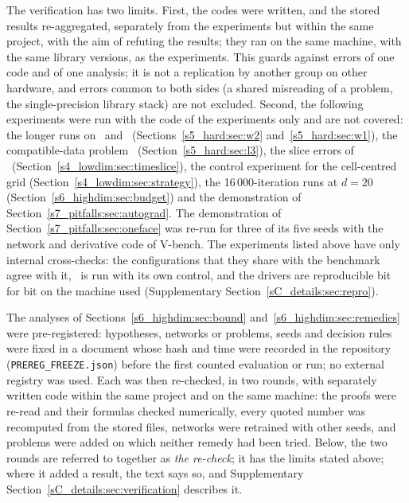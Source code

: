 The verification has two limits. First, the codes were written, and the stored results
re-aggregated, separately from the experiments but within the same project, with the aim of
refuting the results; they ran on the same machine, with the same library versions, as the
experiments. This guards against errors of one code and of one analysis; it is not a
replication by another group on other hardware, and errors common to both sides (a shared
misreading of a problem, the single-precision library stack) are not excluded. Second, the
following experiments were run with the code of the experiments only and are not covered:
the longer runs on \PWtwo\ and \PWone\ (Sections~\ref{s5_hard:sec:w2}
and~\ref{s5_hard:sec:w1}), the compatible-data problem \PLthreeS\
(Section~\ref{s5_hard:sec:l3}), the slice errors of \PH\ (Section~\ref{s4_lowdim:sec:timeslice}),
the control experiment for the cell-centred grid (Section~\ref{s4_lowdim:sec:strategy}), the
16\,000-iteration runs at $d=20$ (Section~\ref{s6_highdim:sec:budget}) and the demonstration
of Section~\ref{s7_pitfalls:sec:autograd}. The demonstration of Section~\ref{s7_pitfalls:sec:oneface}
was re-run for three of its five seeds with the network and derivative code of \textsf{V-bench}.
The experiments listed above have only internal cross-checks: the configurations that they share with the benchmark
agree with it, \PLthreeS\ is run with its own control, and the drivers are reproducible bit
for bit on the machine used (Supplementary Section~\ref{sC_details:sec:repro}).

The analyses of Sections~\ref{s6_highdim:sec:bound} and~\ref{s6_highdim:sec:remedies} were
pre-registered: hypotheses, networks or problems, seeds and decision rules were fixed in a
document whose hash and time were recorded in the repository (\texttt{PREREG\_FREEZE.json}) before
the first counted evaluation or run; no external registry was used. Each was
then re-checked, in two rounds, with separately written code within the same project and on the
same machine: the proofs were re-read and their formulas checked numerically, every quoted number
was recomputed from the stored files, networks were retrained with other seeds, and problems were
added on which neither remedy had been tried. Below, the two rounds are referred to together as
\emph{the re-check}; it has the limits stated above; where it added a result, the text says so, and
Supplementary Section~\ref{sC_details:sec:verification} describes it.
